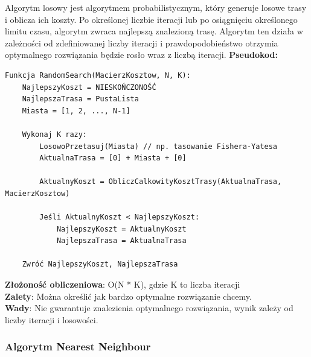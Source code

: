 \documentclass[a4paper,12pt]{article}
\begin{document}
Algorytm losowy jest algorytmem probabilistycznym, który generuje losowe trasy i oblicza ich koszty.
Po określonej liczbie iteracji lub po osiągnięciu określonego limitu czasu, algorytm zwraca najlepszą znalezioną trasę.
Algorytm ten działa w zależności od zdefiniowanej liczby iteracji i prawdopodobieństwo otrzymia optymalnego rozwiązania będzie rosło wraz z liczbą iteracji.
\textbf{Pseudokod:} \\
\begin{verbatim}
Funkcja RandomSearch(MacierzKosztow, N, K):
    NajlepszyKoszt = NIESKOŃCZONOŚĆ
    NajlepszaTrasa = PustaLista
    Miasta = [1, 2, ..., N-1]
    
    Wykonaj K razy:
        LosowoPrzetasuj(Miasta) // np. tasowanie Fishera-Yatesa
        AktualnaTrasa = [0] + Miasta + [0]
        
        AktualnyKoszt = ObliczCalkowityKosztTrasy(AktualnaTrasa, MacierzKosztow)
        
        Jeśli AktualnyKoszt < NajlepszyKoszt:
            NajlepszyKoszt = AktualnyKoszt
            NajlepszaTrasa = AktualnaTrasa
            
    Zwróć NajlepszyKoszt, NajlepszaTrasa
\end{verbatim}
\textbf{Złożoność obliczeniowa}: O(N * K), gdzie K to liczba iteracji \\
\textbf{Zalety}: Można określić jak bardzo optymalne rozwiązanie chcemy. \\
\textbf{Wady}: Nie gwarantuje znalezienia optymalnego rozwiązania, wynik zależy od liczby iteracji i losowości.


\subsubsection{Algorytm Nearest Neighbour}
\end{document}
